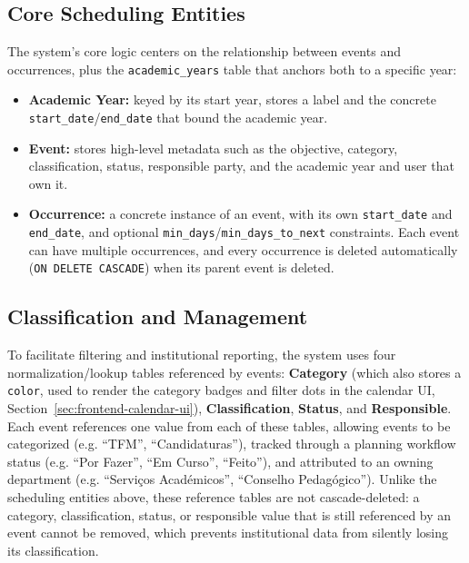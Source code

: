 \subsection{Core Scheduling Entities} \label{sec:core-entities}

The system's core logic centers on the relationship between events and occurrences, plus the \texttt{academic\_years} table that anchors both to a specific year:

\begin{itemize}
    \item \textbf{Academic Year:} keyed by its start year, stores a label and the concrete \texttt{start\_date}/\texttt{end\_date} that bound the academic year.
    \item \textbf{Event:} stores high-level metadata such as the objective, category, classification, status, responsible party, and the academic year and user that own it.
    \item \textbf{Occurrence:} a concrete instance of an event, with its own \texttt{start\_date} and \texttt{end\_date}, and optional \texttt{min\_days}/\texttt{min\_days\_to\_next} constraints. Each event can have multiple occurrences, and every occurrence is deleted automatically (\texttt{ON DELETE CASCADE}) when its parent event is deleted.
\end{itemize}

\subsection{Classification and Management} \label{sec:classification-entities}

To facilitate filtering and institutional reporting, the system uses four normalization/lookup tables referenced by events: \textbf{Category} (which also stores a \texttt{color}, used to render the category badges and filter dots in the calendar UI, Section~\ref{sec:frontend-calendar-ui}), \textbf{Classification}, \textbf{Status}, and \textbf{Responsible}. Each event references one value from each of these tables, allowing events to be categorized (e.g. ``TFM'', ``Candidaturas''), tracked through a planning workflow status (e.g. ``Por Fazer'', ``Em Curso'', ``Feito''), and attributed to an owning department (e.g. ``Serviços Académicos'', ``Conselho Pedagógico''). Unlike the scheduling entities above, these reference tables are not cascade-deleted: a category, classification, status, or responsible value that is still referenced by an event cannot be removed, which prevents institutional data from silently losing its classification.

